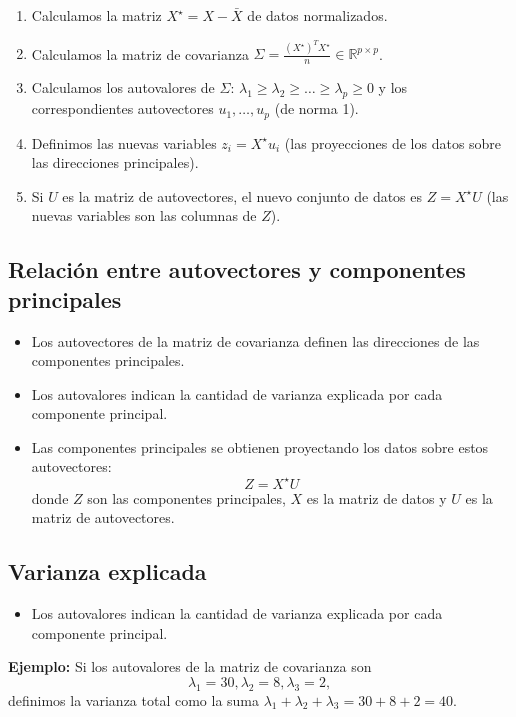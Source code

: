 \documentclass[a4paper]{article}
\newcommand{\R}{{\mathbb R}}
\begin{document}
    \begin{enumerate}
        \item Calculamos la matriz $X^\star = X - \bar X$ de datos normalizados.
        \item Calculamos la matriz de covarianza $\Sigma = \frac{(X^\star)^T X^\star}{n} \in \R^{p \times p}$.
        \item Calculamos los autovalores de $\Sigma$: $\lambda_1 \ge \lambda_2 \ge  \dots \ge \lambda_p \ge 0$ y los correspondientes autovectores $u_1, \dots, u_p$ (de norma 1).

        \item Definimos las nuevas variables $z_i = X^\star u_i$ (las proyecciones de los datos sobre las direcciones principales).
        \item Si $U$ es la matriz de autovectores, el nuevo conjunto de datos es $Z = X^\star U$ (las nuevas variables son las columnas de $Z$).
    \end{enumerate}

\subsection{Relación entre autovectores y componentes principales}
\begin{itemize}
    \item Los autovectores de la matriz de covarianza definen las direcciones de las componentes principales.
    \item Los autovalores indican la cantidad de varianza explicada por cada componente principal.
    \item Las componentes principales se obtienen proyectando los datos sobre estos autovectores:
\[
Z = X^\star U
\]
donde $Z$ son las componentes principales, \( {X} \) es la matriz de datos y \( {U} \) es la matriz de autovectores.
\end{itemize}

\subsection{Varianza explicada}
\begin{itemize}
    \item Los autovalores indican la cantidad de varianza explicada por cada componente principal.
\end{itemize}

\textbf{Ejemplo:} Si los autovalores de la matriz de covarianza son
$$
\lambda_1 = 30, \lambda_2 = 8, \lambda_3 = 2,
$$
definimos la varianza total como la suma $\lambda_1 + \lambda_2 + \lambda_3 = 30 + 8 + 2 = 40$.
\end{document}

